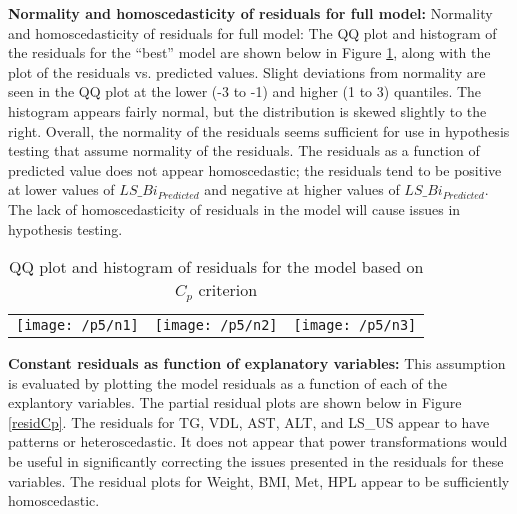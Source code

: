 \documentclass{article}
\begin{document}
\textbf{Normality and homoscedasticity of residuals for full model:} Normality and homoscedasticity of residuals for full model: The QQ plot and histogram of the residuals for the “best” model are shown below in Figure \ref{norm}, along with the plot of the residuals vs. predicted values. Slight deviations from normality are seen in the QQ plot at the lower (-3 to -1) and higher (1 to 3) quantiles. The histogram appears fairly normal, but the distribution is skewed slightly to the right. Overall, the normality of the residuals seems sufficient for use in hypothesis testing that assume normality of the residuals. The residuals as a function of predicted value does not appear homoscedastic; the residuals tend to be positive at lower values of $LS\_Bi_{Predicted}$ and negative at higher values of $LS\_Bi_{Predicted}$. The lack of homoscedasticity of residuals in the model will cause issues in hypothesis testing.  \\

\begin{table}[H]
\centering
\caption {QQ plot and histogram of residuals for the model based on $C_p$ criterion} \label{norm} 
\begin{tabular}{c c c}
\begin{minipage}{.28\textwidth}
\centering
\texttt{[image: /p5/n1]}
\end{minipage}
&
\begin{minipage}{.28\textwidth}
\centering
\texttt{[image: /p5/n2]}
\end{minipage}
&
\begin{minipage}{.28\textwidth}
\centering
\texttt{[image: /p5/n3]}
\end{minipage}
\end{tabular}
\end{table}

\textbf{Constant residuals as function of explanatory variables:} This assumption is evaluated by plotting the model residuals as a function of each of the explantory variables. The partial residual plots are shown below in Figure \ref{residCp}.  The residuals for TG, VDL, AST, ALT, and LS\_US appear to have patterns or heteroscedastic. It does not appear that power transformations would be useful in significantly correcting the issues presented in the residuals for these variables. The residual plots for Weight, BMI, Met, HPL appear to be sufficiently homoscedastic. \\
\end{document}
